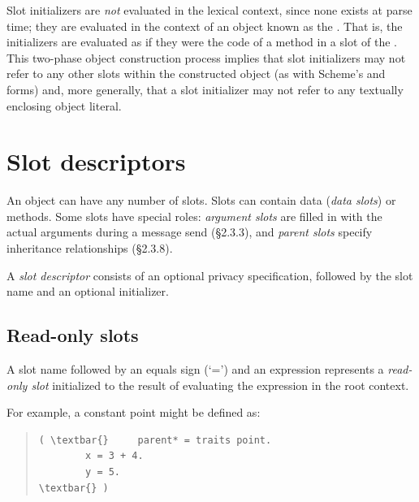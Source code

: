 \documentclass[letterpaper,10pt,english]{sphinxmanual}
\begin{document}
Slot initializers are \emph{not} evaluated in the lexical context, since none exists at parse time; they are evaluated
in the context of an object known as the . That is, the initializers are evaluated as if they were the code
of a method in a slot of the . This two-phase object construction pro­cess implies that slot initializers may
not refer to any other slots within the constructed object (as with Scheme’s  and  forms) and, more generally,
that a slot initializer may not refer to any textually enclosing object literal.


\section{Slot descriptors}
\label{langref:slot-descriptors}\label{langref:index-33}
An object can have any number of slots. Slots can contain data (\emph{data slots}) or methods. Some slots have special roles: \emph{argument slots} are filled in with the actual arguments during a message send (\S{}2.3.3), and \emph{parent slots} specify inheritance relationships (\S{}2.3.8).

A \emph{slot descriptor} consists of an optional privacy specification, followed by the slot name and an optional initializer.


\subsection{Read-only slots}
\label{langref:read-only-slots}
A slot name followed by an equals sign (‘=’) and an expression represents a \emph{read-only slot} initialized to the result of evaluating the expression in the root context.

For example, a constant point might be defined as:
\begin{quote}

\begin{Verbatim}[commandchars=\\\{\}]
( \textbar{}     parent* = traits point.
        x = 3 + 4.
        y = 5.
\textbar{} )
\end{Verbatim}
\end{quote}
\end{document}
